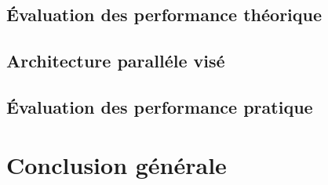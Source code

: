 \documentclass[11pt,french]{article}
\begin{document}
	\subsection{Évaluation des performance théorique}
	
	\subsection{Architecture paralléle visé}
	
	\subsection{Évaluation des performance pratique}
	
	\section{Conclusion générale}
	
\end{document}
